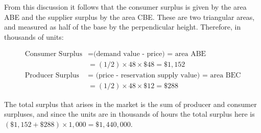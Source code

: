 From this discussion it follows that the consumer surplus is given by the
area ABE and the supplier surplus by the area CBE. These are two
triangular areas, and measured as half of the base by the perpendicular
height. Therefore, in thousands of units:

\begin{align*}
\text{Consumer Surplus}& =\text{(demand value - price) = area ABE} \\
& =(1/2)\times 48\times \$48=\$1,152 \\
\text{Producer Surplus }& \text{= (price - reservation supply value) = area
BEC} \\
& =(1/2)\times 48\times \$12=\$288
\end{align*}

The total surplus that arises in the market is the sum of producer and
consumer surpluses, and since the units are in thousands of hours the total
surplus here is  $(\$1,152+\$288)\times 1,000=\$1,440,000$.
